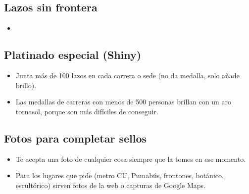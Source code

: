 \subsection*{Lazos sin frontera}
\begin{itemize}[leftmargin=*]
  \item {}
\end{itemize}

\subsection*{Platinado especial (Shiny)}
\begin{itemize}[leftmargin=*]
  \item Junta más de 100 lazos en cada carrera o sede (no da medalla, solo añade brillo).
  \item Las medallas de carreras con menos de 500 personas brillan con un aro tornasol, porque son más difíciles de conseguir.
\end{itemize}

\subsection*{Fotos para completar sellos}
\begin{itemize}[leftmargin=*]
  \item Te acepta una foto de cualquier cosa siempre que la tomes en ese momento.
  \item Para los lugares que pide (metro CU, Pumabús, frontones, botánico, escultórico) sirven fotos de la web o capturas de Google Maps.
\end{itemize}
